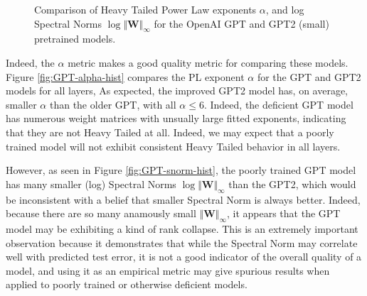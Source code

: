 \begin{figure}
    \centering
    \qquad


   \caption{Comparison of Heavy Tailed Power Law exponents $\alpha$, and log Spectral Norms $\log\Vert\mathbf{W}\Vert_{\infty}$
for the OpenAI GPT and GPT2 (small) pretrained models.}

\end{figure}

Indeed, the $\alpha$ metric makes a good quality metric for comparing these models.
Figure \ref{fig:GPT-alpha-hist} compares the PL exponent $\alpha$ for the GPT and GPT2 models for all layers,
As expected, the improved GPT2 model has, on average, smaller $\alpha$ than the older GPT, with all
$\alpha\le6$.  Indeed, the deficient GPT model has numerous weight matrices with unsually large fitted exponents,
indicating that they are not Heavy Tailed at all.  Indeed, we may expect that a poorly trained model
will not exhibit consistent Heavy Tailed behavior in all layers.

However, as seen in Figure \ref{fig:GPT-snorm-hist},
 the poorly trained GPT model has many smaller (log) Spectral Norms $\log\Vert\mathbf{W}\Vert_{\infty}$
than the GPT2, which would be inconsistent with a belief that smaller Spectral Norm is always better.
Indeed, because there are so many anamously small $\Vert\mathbf{W}\Vert_{\infty}$,
it appears that the GPT model may be exhibiting a kind of rank collapse.
This is an extremely important observation because it demonstrates that while the Spectral Norm
may correlate well with predicted test error, it is not a good indicator of the overall quality of a model,
and using it as an empirical metric may give spurious results when applied to poorly trained
or otherwise deficient models.  


